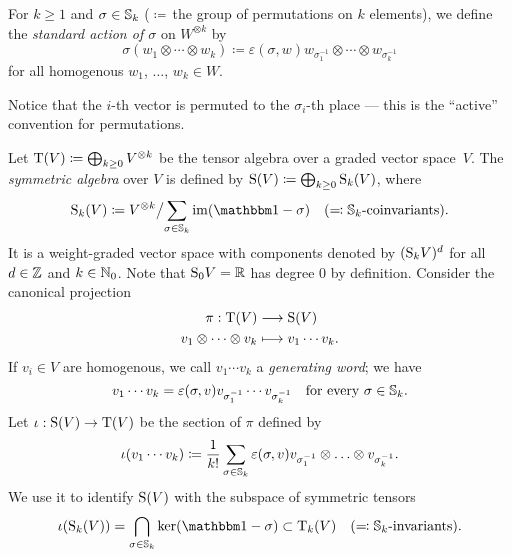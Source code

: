 \documentclass[\MainFolder/Text.tex]{subfiles}
\begin{document}

\begin{Definition}\label{Def:Permutations}
For $k\ge 1$ and $\sigma\in \mathbb{S}_k$ ($\coloneqq$\,the group of permutations on $k$ elements), we define the \emph{standard action of $\sigma$} on $W^{\otimes k}$ by 
\begin{equation}\label{Eq:Perm}
\sigma(w_1 \otimes \dotsb \otimes w_k) \coloneqq  \varepsilon(\sigma,w) w_{\sigma_1^{-1}}\otimes \dotsb \otimes w_{\sigma_k^{-1}}
\end{equation}
for all homogenous $w_1$, $\dotsc$, $w_k\in W$.
\end{Definition}

Notice that the $i$-th vector is permuted to the $\sigma_i$-th place --- this is the ``active'' convention for permutations.


\begin{Definition}\label{Def:SymAlgebra}
Let $\mathrm{T}(V)\coloneqq \bigoplus_{k\ge 0} V^{\otimes k}$ be the tensor algebra over a graded vector space~$V$. The \emph{symmetric algebra} over $V$ is defined by $\mathrm{S}(V)\coloneqq \bigoplus_{k\ge 0} \mathrm{S}_k(V)$, where
\[ \Sym_k(V) \coloneqq V^{\otimes k} \bigl/ \sum_{\sigma\in \Perm_k} \Im(\Id-\sigma)\quad(\eqqcolon \Perm_k\text{-coinvariants}). \]
It is a weight-graded vector space with components denoted by $(\mathrm{S}_k V)^d$ for all $d\in \mathbb{Z}$ and $k\in \mathbb{N}_0$. Note that $\mathrm{S}_0 V = \mathbb{R}$ has degree $0$ by definition. Consider the canonical projection
\[\begin{aligned}
\pi : \mathrm{T}(V) &\longrightarrow \mathrm{S}(V) \\
v_1\otimes \dotsb \otimes v_k &\longmapsto v_1\dotsb v_k.
\end{aligned}\]
If $v_i\in V$ are homogenous, we call $v_1 \dotsb v_k$ a \emph{generating word}; we have
\[ v_1 \dotsb  v_k = \varepsilon(\sigma,v) v_{\sigma_1^{-1}} \dotsb v_{\sigma_k^{-1}}\quad \text{for every }\sigma\in \mathbb{S}_k. \]
Let $\iota: \mathrm{S}(V) \rightarrow \mathrm{T}(V)$ be the section of $\pi$ defined by 
\[ \iota(v_1\dotsb v_k) \coloneqq \frac{1}{k!}\sum_{\sigma\in\mathbb{S}_k} \varepsilon(\sigma,v) v_{\sigma_1^{-1}}\otimes \ldots \otimes v_{\sigma_k^{-1}}. \]
We use it to identify $\mathrm{S}(V)$ with the subspace of symmetric tensors
\[ \iota(\Sym_k(V)) = \bigcap_{\sigma\in \Perm_k} \Ker(\Id - \sigma) \subset \Ten_k(V)\quad(\eqqcolon\Perm_k\text{-invariants}). \]
\end{Definition}
\end{document}
